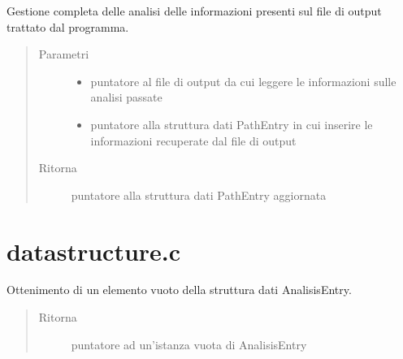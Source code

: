 \documentclass[letterpaper,10pt,italian,openany,oneside]{sphinxmanual}
\begin{document}
\begin{fulllineitems}
\label{\detokenize{code/outputscan:c.readOutputFile}}
Gestione completa delle analisi delle informazioni presenti sul file di output trattato dal programma.
\begin{quote}\begin{description}
\item[{Parametri}] \leavevmode\begin{itemize}
\item {} 
 \textendash{} puntatore al file di output da cui leggere le informazioni sulle analisi passate

\item {} 
 \textendash{} puntatore alla struttura dati PathEntry in cui inserire le informazioni recuperate dal file di output

\end{itemize}

\item[{Ritorna}] \leavevmode
puntatore alla struttura dati PathEntry aggiornata

\end{description}\end{quote}

\end{fulllineitems}



\section{datastructure.c}
\label{\detokenize{code/datastructure:datastructure-c}}\label{\detokenize{code/datastructure::doc}}

\begin{fulllineitems}
\label{\detokenize{code/datastructure:c.emptyAnalisis}}
Ottenimento di un elemento vuoto della struttura dati AnalisisEntry.
\begin{quote}\begin{description}
\item[{Ritorna}] \leavevmode
puntatore ad un’istanza vuota di AnalisisEntry

\end{description}\end{quote}

\end{fulllineitems}
\end{document}
